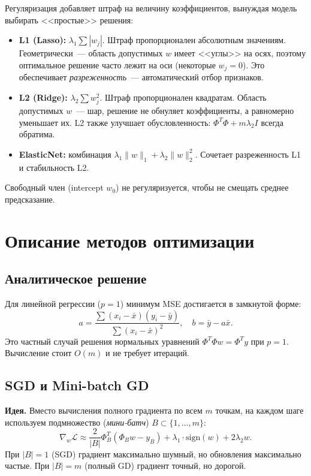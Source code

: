 \documentclass[12pt]{article}
\begin{document}
Регуляризация добавляет штраф на величину коэффициентов, вынуждая модель выбирать <<простые>> решения:
\begin{itemize}
    \item \textbf{L1 (Lasso):} $\lambda_1 \sum |w_j|$. Штраф пропорционален абсолютным значениям. Геометрически~--- область допустимых $w$ имеет <<углы>> на осях, поэтому оптимальное решение часто лежит на оси (некоторые $w_j = 0$). Это обеспечивает \textit{разреженность}~--- автоматический отбор признаков.
    \item \textbf{L2 (Ridge):} $\lambda_2 \sum w_j^2$. Штраф пропорционален квадратам. Область допустимых $w$~--- шар, решение не обнуляет коэффициенты, а равномерно уменьшает их. L2 также улучшает обусловленность: $\Phi^T\Phi + m\lambda_2 I$ всегда обратима.
    \item \textbf{ElasticNet:} комбинация $\lambda_1 \|w\|_1 + \lambda_2 \|w\|_2^2$. Сочетает разреженность L1 и стабильность L2.
\end{itemize}

Свободный член (intercept $w_0$) не регуляризуется, чтобы не смещать среднее предсказание.

\section{Описание методов оптимизации}

\subsection{Аналитическое решение}

Для линейной регрессии ($p=1$) минимум MSE достигается в замкнутой форме:
\[
    a = \frac{\sum (x_i - \bar{x})(y_i - \bar{y})}{\sum (x_i - \bar{x})^2}, \quad b = \bar{y} - a\bar{x}.
\]
Это частный случай решения нормальных уравнений $\Phi^T\Phi w = \Phi^T y$ при $p=1$. Вычисление стоит $O(m)$ и не требует итераций.

\subsection{SGD и Mini-batch GD}

\textbf{Идея.} Вместо вычисления полного градиента по всем $m$ точкам, на каждом шаге используем подмножество (\textit{мини-батч}) $B \subset \{1, \ldots, m\}$:
\[
    \nabla_w \mathcal{L} \approx \frac{2}{|B|} \Phi_B^T(\Phi_B w - y_B) + \lambda_1 \cdot \text{sign}(w) + 2\lambda_2 w.
\]
При $|B| = 1$ (SGD) градиент максимально шумный, но обновления максимально частые. При $|B| = m$ (полный GD) градиент точный, но дорогой.
\end{document}

